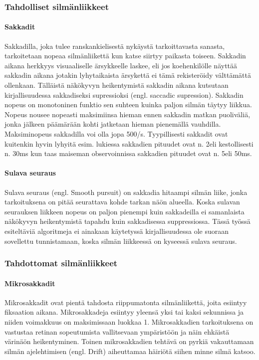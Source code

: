 \subsubsection{Tahdolliset silmänliikkeet}  
\paragraph{Sakkadit}
Sakkadilla, joka tulee ranskankielisestä nykäystä tarkoittavasta sanasta, tarkoitetaan nopeaa silmänliikettä kun katse siirtyy paikasta toiseen. Sakkadin aikana herkkyys visuaaliselle ärsykkeelle laskee, eli jos koehenkilölle näyttää sakkadin aikana jotakin lyhytaikaista ärsykettä ei tämä rekisteröidy välttämättä ollenkaan. Tälläistä näkökyvyn heikentymistä sakkadin aikana kutsutaan kirjallisuudessa sakkadiseksi supressioksi (engl. saccadic supression).\citep[s.899]{matin1974saccadic} Sakkadin nopeus on monotoninen funktio sen suhteen kuinka paljon silmän täytyy liikkua. Nopeus nousee nopeasti maksimiinsa hieman ennen sakkadin matkan puoliväliä, jonka jälkeen päämärään kohti jatketaan hieman pienemällä vauhdilla. Maksiminopeus sakkadilla voi olla jopa 500\degree /s. Tyypillisesti sakkadit ovat kuitenkin hyvin lyhyitä esim. lukiessa sakkadien pituudet ovat n. 2\degree eli kestollisesti n. 30ms kun taas maiseman observoinnissa sakkadien pituudet ovat n. 5\degree eli 50ms. \citep[s.373]{rayner1998eye}

\paragraph{Sulava seuraus}

Sulava seuraus (engl. Smooth pursuit) on sakkadia hitaampi silmän liike, jonka tarkoituksena on pitää seurattava kohde tarkan näön alueella. Koska sulavan seurauksen liikkeen nopeus on paljon pienempi kuin sakkadeilla ei samanlaista näkökyvyn heikentymistä tapahdu kuin sakkadisessa suppressiossa.\citep[s.373]{rayner1998eye} Tässä työssä esiteltäviä algoritmeja ei ainakaan käytetyssä kirjallisuudessa ole suoraan sovellettu tunnistamaan, koska silmän liikkeessä on kyseessä sulava seuraus. 

\subsubsection{Tahdottomat silmänliikkeet} 
\paragraph{Mikrosakkadit}
Mikrosakkadit ovat pientä tahdosta riippumatonta silmänliikettä, joita esiintyy fiksaation aikana. Mikrosakkadeja esiintyy yleensä yksi tai kaksi sekunnissa ja niiden voimakkuus on maksimissaan luokkaa 1\degree.\citep[s.431]{engbert2004} Mikrosakkadien tarkoituksena on vastustaa retinan sopeutumista vallitsevaan ympäristöön ja näin ehkäistä värinäön heikentyminen.\citep[s.374]{arend1973} Toinen mikrosakkadien tehtävä on pyrkiä vakauttamaan silmän ajelehtimisen (engl. Drift) aiheuttamaa häiriötä siihen minne silmä katsoo.\citep[s.431]{engbert2004}


